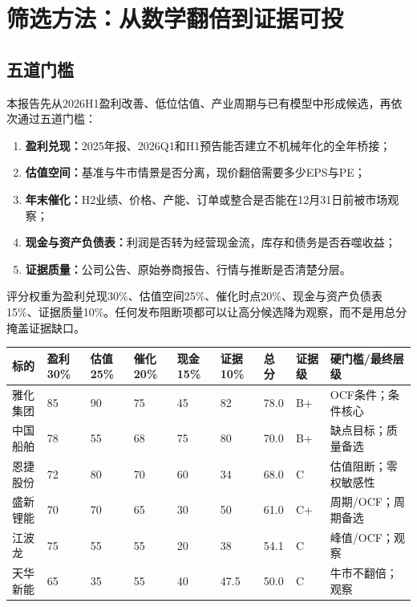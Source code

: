 \chapter{筛选方法：从数学翻倍到证据可投}

\section{五道门槛}

本报告先从2026H1盈利改善、低位估值、产业周期与已有模型中形成候选，再依次通过五道门槛：

\begin{enumerate}
  \item \textbf{盈利兑现：}2025年报、2026Q1和H1预告能否建立不机械年化的全年桥接；
  \item \textbf{估值空间：}基准与牛市情景是否分离，现价翻倍需要多少EPS与PE；
  \item \textbf{年末催化：}H2业绩、价格、产能、订单或整合是否能在12月31日前被市场观察；
  \item \textbf{现金与资产负债表：}利润是否转为经营现金流，库存和债务是否吞噬收益；
  \item \textbf{证据质量：}公司公告、原始券商报告、行情与推断是否清楚分层。
\end{enumerate}

评分权重为盈利兑现30\%、估值空间25\%、催化时点20\%、现金与资产负债表15\%、证据质量10\%。任何发布阻断项都可以让高分候选降为观察，而不是用总分掩盖证据缺口。

\begin{exhibitbox}
\scriptsize
\begin{tabularx}{\exhibitboxwidth}{L{1.9cm} R{1.0cm} R{1.0cm} R{1.0cm} R{1.0cm} R{1.0cm} R{1.0cm} L{1.1cm} X}
\toprule
标的 & 盈利30\% & 估值25\% & 催化20\% & 现金15\% & 证据10\% & 总分 & 证据级 & 硬门槛/最终层级 \\
\midrule
雅化集团 & 85 & 90 & 75 & 45 & 82 & 78.0 & B+ & OCF条件；条件核心 \\
中国船舶 & 78 & 55 & 68 & 75 & 80 & 70.0 & B+ & 缺点目标；质量备选 \\
恩捷股份 & 72 & 80 & 70 & 60 & 34 & 68.0 & C & 估值阻断；零权敏感性 \\
盛新锂能 & 70 & 70 & 65 & 30 & 50 & 61.0 & C+ & 周期/OCF；周期备选 \\
江波龙 & 75 & 55 & 55 & 20 & 38 & 54.1 & C & 峰值/OCF；观察 \\
天华新能 & 65 & 35 & 55 & 40 & 47.5 & 50.0 & C & 牛市不翻倍；观察 \\
\bottomrule
\end{tabularx}
\end{exhibitbox}

